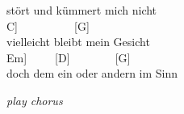 \documentclass[
  letterpaper,
  a5paper]{memoir}
\begin{document}
stört und kümmert mich nicht\\
\hspace*{0.333em}\hspace*{0.333em}\hspace*{0.333em}\hspace*{0.333em}\hspace*{0.333em}\hspace*{0.333em}\hspace*{0.333em}\hspace*{0.333em}\hspace*{0.333em}\hspace*{0.333em}{[}C{]}~~~~~~~~~~{[}G{]}\\
vielleicht bleibt mein Gesicht\\
\hspace*{0.333em}\hspace*{0.333em}\hspace*{0.333em}\hspace*{0.333em}\hspace*{0.333em}\hspace*{0.333em}\hspace*{0.333em}\hspace*{0.333em}{[}Em{]}~~~~~{[}D{]}~~~~~~~~{[}G{]}\\
doch dem ein oder andern im Sinn

\emph{play chorus}
\end{document}
